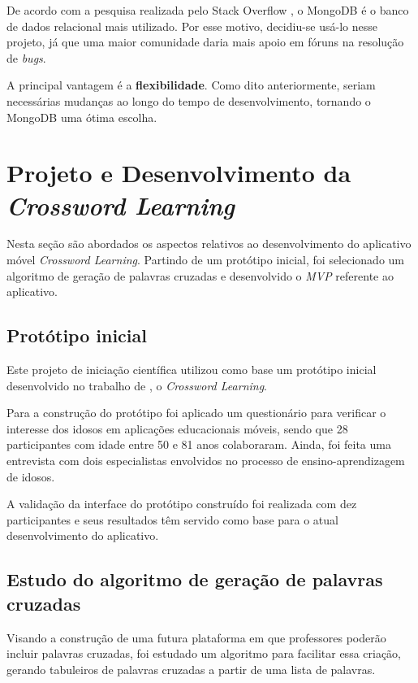 De acordo com a pesquisa realizada pelo Stack Overflow \citep{stackoverflowmongo}, o MongoDB é o banco de dados relacional mais utilizado. Por esse motivo, decidiu-se usá-lo nesse projeto, já que uma maior comunidade daria mais apoio em fóruns na resolução de \textit{bugs}.

A principal vantagem é a \textbf{flexibilidade}. Como dito anteriormente, seriam necessárias mudanças ao longo do tempo de desenvolvimento, tornando o MongoDB uma ótima escolha.

\section{Projeto e Desenvolvimento da \textit{Crossword Learning}}
Nesta seção são abordados os aspectos relativos ao desenvolvimento do aplicativo móvel \textit{Crossword Learning}. Partindo de um protótipo inicial, foi selecionado um algoritmo de geração de palavras cruzadas e desenvolvido o \textit{MVP} referente ao aplicativo.

\subsection{Protótipo inicial}
\label{subsec:prototipoInicial}
Este projeto de iniciação científica utilizou como base um protótipo inicial desenvolvido no trabalho de \cite{oliveira2018crossword}, o \textit{Crossword Learning}.

Para a construção do protótipo foi aplicado um questionário para verificar o interesse dos idosos em aplicações educacionais móveis, sendo que 28 participantes com idade entre 50 e 81 anos colaboraram. Ainda, foi feita uma entrevista com dois especialistas envolvidos no processo de ensino-aprendizagem de idosos.

A validação da interface do protótipo construído foi realizada com dez participantes e seus resultados têm servido como base para o atual desenvolvimento do aplicativo. 


\subsection{Estudo do algoritmo de geração de palavras cruzadas}
Visando a construção de uma futura plataforma em que professores poderão incluir palavras cruzadas, foi estudado um algoritmo para facilitar essa criação, gerando tabuleiros de palavras cruzadas a partir de uma lista de palavras.

